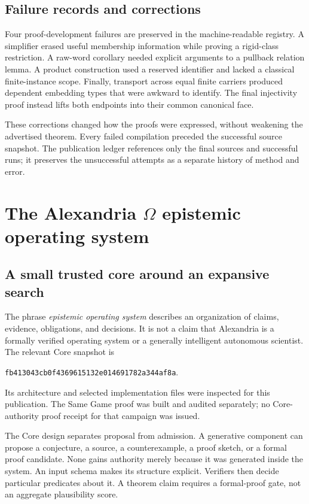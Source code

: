\documentclass[11pt,reqno]{amsart}
\theoremstyle{definition}
\newcommand{\coresha}{\texttt{fb413043cb0f4369615132e014691782a344af8a}}
\begin{document}
\subsection{Failure records and corrections}
Four proof-development failures are preserved in the machine-readable
registry. A simplifier erased useful membership information while proving a
rigid-class restriction. A raw-word corollary needed explicit arguments to
a pullback relation lemma. A product construction used a reserved identifier
and lacked a classical finite-instance scope. Finally, transport across
equal finite carriers produced dependent embedding types that were awkward
to identify. The final injectivity proof instead lifts both endpoints into
their common canonical face.

These corrections changed how the proofs were expressed, without weakening
the advertised theorem. Every failed compilation preceded the successful
source snapshot. The publication ledger references only the final sources
and successful runs; it preserves the unsuccessful attempts as a separate
history of method and error.

\section{The Alexandria \texorpdfstring{$\Omega$}{Omega} epistemic operating system}\label{sec:architecture}
\subsection{A small trusted core around an expansive search}
The phrase \emph{epistemic operating system} describes an organization of
claims, evidence, obligations, and decisions. It is not a claim that Alexandria
is a formally verified operating system or a generally intelligent autonomous
scientist. The relevant Core snapshot is
\begin{center}\footnotesize\coresha.\end{center}
Its architecture and selected implementation files were inspected for this
publication. The Same Game proof was built and audited separately; no
Core-authority proof receipt for that campaign was issued.

The Core design separates proposal from admission. A generative component
can propose a conjecture, a source, a counterexample, a proof sketch, or a
formal proof candidate. None gains authority merely because it was generated
inside the system. An input schema makes its structure explicit. Verifiers
then decide particular predicates about it. A theorem claim requires a
formal-proof gate, not an aggregate plausibility score.
\end{document}

